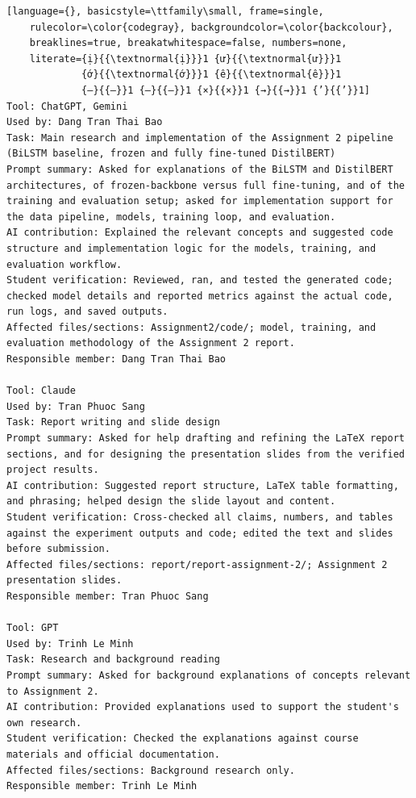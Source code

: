 \begin{lstlisting}[language={}, basicstyle=\ttfamily\small, frame=single,
    rulecolor=\color{codegray}, backgroundcolor=\color{backcolour},
    breaklines=true, breakatwhitespace=false, numbers=none,
    literate={ị}{{\textnormal{ị}}}1 {ư}{{\textnormal{ư}}}1
             {ớ}{{\textnormal{ớ}}}1 {ê}{{\textnormal{ê}}}1
             {—}{{—}}1 {–}{{–}}1 {×}{{×}}1 {→}{{→}}1 {’}{{’}}1]
Tool: ChatGPT, Gemini
Used by: Dang Tran Thai Bao
Task: Main research and implementation of the Assignment 2 pipeline (BiLSTM baseline, frozen and fully fine-tuned DistilBERT)
Prompt summary: Asked for explanations of the BiLSTM and DistilBERT architectures, of frozen-backbone versus full fine-tuning, and of the training and evaluation setup; asked for implementation support for the data pipeline, models, training loop, and evaluation.
AI contribution: Explained the relevant concepts and suggested code structure and implementation logic for the models, training, and evaluation workflow.
Student verification: Reviewed, ran, and tested the generated code; checked model details and reported metrics against the actual code, run logs, and saved outputs.
Affected files/sections: Assignment2/code/; model, training, and evaluation methodology of the Assignment 2 report.
Responsible member: Dang Tran Thai Bao

Tool: Claude
Used by: Tran Phuoc Sang
Task: Report writing and slide design
Prompt summary: Asked for help drafting and refining the LaTeX report sections, and for designing the presentation slides from the verified project results.
AI contribution: Suggested report structure, LaTeX table formatting, and phrasing; helped design the slide layout and content.
Student verification: Cross-checked all claims, numbers, and tables against the experiment outputs and code; edited the text and slides before submission.
Affected files/sections: report/report-assignment-2/; Assignment 2 presentation slides.
Responsible member: Tran Phuoc Sang

Tool: GPT
Used by: Trinh Le Minh
Task: Research and background reading
Prompt summary: Asked for background explanations of concepts relevant to Assignment 2.
AI contribution: Provided explanations used to support the student's own research.
Student verification: Checked the explanations against course materials and official documentation.
Affected files/sections: Background research only.
Responsible member: Trinh Le Minh

\end{lstlisting}

